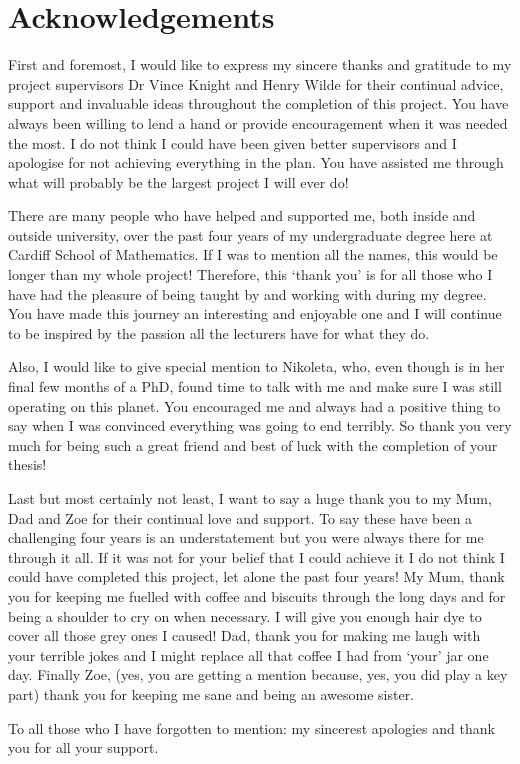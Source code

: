 \chapter{Acknowledgements}

First and foremost, I would like to express my sincere thanks and gratitude to
my project supervisors Dr Vince Knight and Henry Wilde for their continual
advice, support and invaluable ideas throughout the completion of this project.
You have always been willing to lend a hand or provide encouragement when
it was needed the most. I do not think I could have been given better supervisors
and I apologise for not achieving everything in the plan. You have assisted me
through what will probably be the largest project I will ever do!

There are many people who have helped and supported me, both inside and outside
university, over the past four years of my undergraduate degree here at Cardiff
School of Mathematics. If I was to mention all the names, this would be longer
than my whole project! Therefore, this `thank you' is for all those who I have
had the pleasure of being taught by and working with during my degree. You have
made this journey an interesting and enjoyable one and I will continue to be
inspired by the passion all the lecturers have for what they do. 

Also, I would like to give special mention to Nikoleta, who, even though is in
her final few months of a PhD, found time
to talk with me and make sure I was still operating on this planet. You
encouraged me and always had a positive thing to say when I was convinced
everything was going to end terribly. So thank you very much for being
such a great friend and best of luck with the completion of your thesis!

Last but most certainly not least, I want to say a huge thank you to my Mum, Dad
and Zoe for their continual love and support. To say these have been a
challenging four years is an understatement but you were always there for me
through it all. If it was not for your belief that I could achieve it I do not
think I could have completed this project, let alone the past four years! My
Mum, thank you for keeping me fuelled with coffee and biscuits through the long
days and for being a shoulder to cry on when necessary. I will give you enough
hair dye to cover all those grey ones I caused! Dad, thank you for making me
laugh with your terrible jokes and I might replace all that coffee I had from
`your' jar one day. Finally Zoe, (yes, you are
getting a mention because, yes, you did play a key part) thank you for keeping
me sane and being an awesome sister.

To all those who I have forgotten to mention: my sincerest apologies and thank
you for all your support.